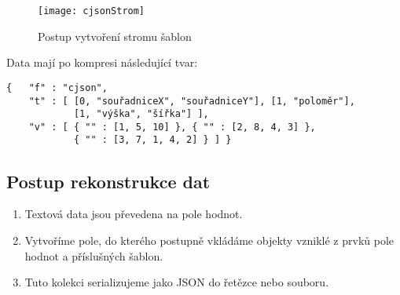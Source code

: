 \begin{figure}[!htb]
\centering
\texttt{[image: cjsonStrom]}
\caption{Postup vytvoření stromu šablon}
\label{cjsonKonstrukceStromu}
\end{figure}

\newpage
Data mají po kompresi následující tvar:

\begin{verbatim}
{   "f" : "cjson",
    "t" : [ [0, "souřadniceX", "souřadniceY"], [1, "poloměr"],
            [1, "výška", "šířka"] ],
    "v" : [ { "" : [1, 5, 10] }, { "" : [2, 8, 4, 3] },
            { "" : [3, 7, 1, 4, 2] } ] }
\end{verbatim}

\subsection{Postup rekonstrukce dat}
\begin{enumerate}
\item Textová data jsou převedena na pole hodnot.
\item Vytvoříme pole, do kterého postupně vkládáme objekty vzniklé z prvků pole hodnot a příslušných šablon.
\item Tuto kolekci serializujeme jako JSON do řetězce nebo souboru.
\end{enumerate}